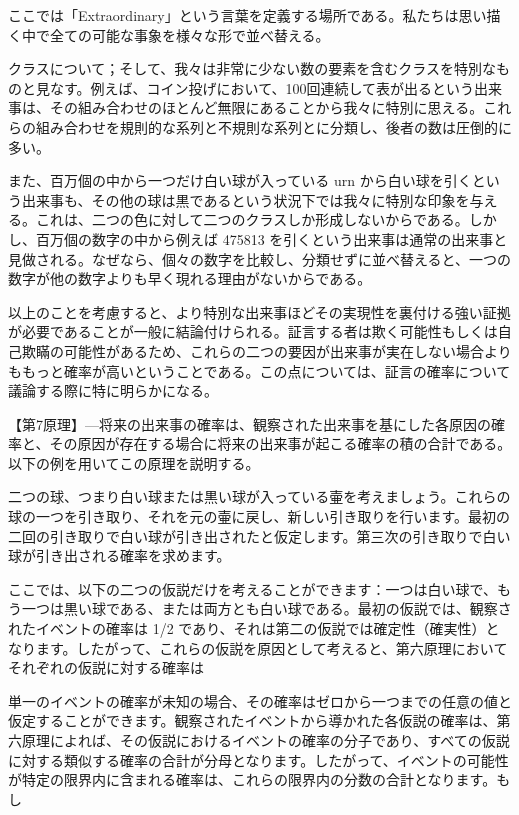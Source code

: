 \documentclass[a4paper,11pt,openany]{ltjsbook}
\begin{document}
ここでは「Extraordinary」という言葉を定義する場所である。私たちは思い描く中で全ての可能な事象を様々な形で並べ替える。

クラスについて；そして、我々は非常に少ない数の要素を含むクラスを特別なものと見なす。例えば、コイン投げにおいて、100回連続して表が出るという出来事は、その組み合わせのほとんど無限にあることから我々に特別に思える。これらの組み合わせを規則的な系列と不規則な系列とに分類し、後者の数は圧倒的に多い。

また、百万個の中から一つだけ白い球が入っている urn から白い球を引くという出来事も、その他の球は黒であるという状況下では我々に特別な印象を与える。これは、二つの色に対して二つのクラスしか形成しないからである。しかし、百万個の数字の中から例えば 475813 を引くという出来事は通常の出来事と見做される。なぜなら、個々の数字を比較し、分類せずに並べ替えると、一つの数字が他の数字よりも早く現れる理由がないからである。

以上のことを考慮すると、より特別な出来事ほどその実現性を裏付ける強い証拠が必要であることが一般に結論付けられる。証言する者は欺く可能性もしくは自己欺瞞の可能性があるため、これらの二つの要因が出来事が実在しない場合よりももっと確率が高いということである。この点については、証言の確率について議論する際に特に明らかになる。

【第7原理】—将来の出来事の確率は、観察された出来事を基にした各原因の確率と、その原因が存在する場合に将来の出来事が起こる確率の積の合計である。以下の例を用いてこの原理を説明する。

二つの球、つまり白い球または黒い球が入っている壷を考えましょう。これらの球の一つを引き取り、それを元の壷に戻し、新しい引き取りを行います。最初の二回の引き取りで白い球が引き出されたと仮定します。第三次の引き取りで白い球が引き出される確率を求めます。

ここでは、以下の二つの仮説だけを考えることができます：一つは白い球で、もう一つは黒い球である、または両方とも白い球である。最初の仮説では、観察されたイベントの確率は 1/2 であり、それは第二の仮説では確定性（確実性）となります。したがって、これらの仮説を原因として考えると、第六原理においてそれぞれの仮説に対する確率は %

単一のイベントの確率が未知の場合、その確率はゼロから一つまでの任意の値と仮定することができます。観察されたイベントから導かれた各仮説の確率は、第六原理によれば、その仮説におけるイベントの確率の分子であり、すべての仮説に対する類似する確率の合計が分母となります。したがって、イベントの可能性が特定の限界内に含まれる確率は、これらの限界内の分数の合計となります。もし
\end{document}
